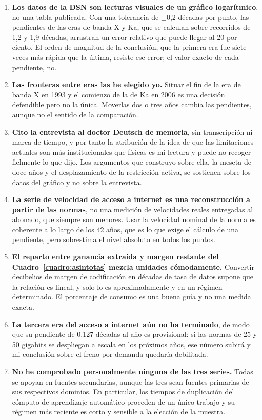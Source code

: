 \documentclass[11pt,letterpaper]{article}
\begin{document}
\begin{enumerate}
\item \textbf{Los datos de la DSN son lecturas visuales de un gráfico
  logarítmico}, no una tabla publicada. Con una tolerancia de $\pm$0,2 décadas
  por punto, las pendientes de las eras de banda X y Ka, que se calculan sobre
  recorridos de 1,2 y 1,9 décadas, arrastran un error relativo que puede llegar
  al 20 por ciento. El orden de magnitud de la conclusión, que la primera era
  fue siete veces más rápida que la última, resiste ese error; el valor exacto
  de cada pendiente, no.
\item \textbf{Las fronteras entre eras las he elegido yo.} Situar el fin de la
  era de banda X en 1993 y el comienzo de la de Ka en 2006 es una decisión
  defendible pero no la única. Moverlas dos o tres años cambia las pendientes,
  aunque no el sentido de la comparación.
\item \textbf{Cito la entrevista al doctor Deutsch de memoria}, sin
  transcripción ni marca de tiempo, y por tanto la atribución de la idea de que
  las limitaciones actuales son más institucionales que físicas es mi lectura y
  puede no recoger fielmente lo que dijo. Los argumentos que construyo sobre
  ella, la meseta de doce años y el desplazamiento de la restricción activa,
  se sostienen sobre los datos del gráfico y no sobre la entrevista.
\item \textbf{La serie de velocidad de acceso a internet es una reconstrucción
  a partir de las normas}, no una medición de velocidades reales entregadas al
  abonado, que siempre son menores. Usar la velocidad nominal de la norma es
  coherente a lo largo de los 42 años, que es lo que exige el cálculo de una
  pendiente, pero sobrestima el nivel absoluto en todos los puntos.
\item \textbf{El reparto entre ganancia extraída y margen restante del
  Cuadro~\ref{cuadro:asintotas} mezcla unidades cómodamente.} Convertir
  decibelios de margen de codificación en décadas de tasa de datos supone que
  la relación es lineal, y solo lo es aproximadamente y en un régimen
  determinado. El porcentaje de consumo es una buena guía y no una medida
  exacta.
\item \textbf{La tercera era del acceso a internet aún no ha terminado}, de
  modo que su pendiente de 0,127 décadas al año es provisional: si las normas
  de 25 y 50 gigabits se despliegan a escala en los próximos años, ese número
  subirá y mi conclusión sobre el freno por demanda quedaría debilitada.
\item \textbf{No he comprobado personalmente ninguna de las tres series.} Todas
  se apoyan en fuentes secundarias, aunque las tres sean fuentes primarias de
  sus respectivos dominios. En particular, los tiempos de duplicación del
  cómputo de aprendizaje automático proceden de un único trabajo
  \parencite{sevilla2022} y su régimen más reciente es corto y sensible a la
  elección de la muestra.
\end{enumerate}

\printbibliography
\end{document}
